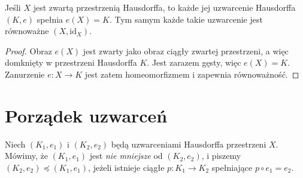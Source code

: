 \begin{stwierdzenie}
\label{prop:topog-uzwarcenia-zwarta}
Jeśli $X$ jest zwartą przestrzenią
Hausdorffa, to każde jej uzwarcenie
Hausdorffa $(K,e)$ spełnia $e(X)=K$.
Tym samym każde takie uzwarcenie
jest równoważne $(X,\mathrm{id}_X)$.
\end{stwierdzenie}
\begin{proof}
Obraz $e(X)$ jest zwarty jako obraz
ciągły zwartej przestrzeni,
a więc domknięty w przestrzeni
Hausdorffa $K$. Jest zarazem gęsty,
więc $e(X)=K$. Zanurzenie
$e\colon X\to K$ jest zatem
homeomorfizmem i zapewnia równoważność.
\end{proof}

\section{Porządek uzwarceń}
\label{sec:topog-uzwarcenia-porzadek}

\begin{definicja}
\label{def:topog-uzwarcenia-porzadek}
Niech $(K_1,e_1)$ i $(K_2,e_2)$ będą
uzwarceniami Hausdorffa przestrzeni $X$.
Mówimy, że $(K_1,e_1)$ jest
\emph{nie mniejsze} od $(K_2,e_2)$,
i piszemy $(K_2,e_2)\preccurlyeq(K_1,e_1)$,
jeżeli istnieje ciągłe
$p\colon K_1\to K_2$ spełniające
$p\circ e_1=e_2$.
\end{definicja}

